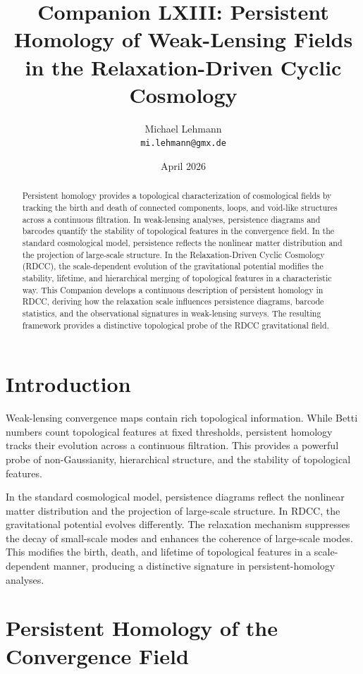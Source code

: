 \documentclass[11pt,a4paper]{article}
\title{\textbf{Companion LXIII: Persistent Homology of Weak-Lensing Fields in the Relaxation-Driven Cyclic Cosmology}}
\author{Michael Lehmann \\ \texttt{mi.lehmann@gmx.de}}
\date{April 2026}
\begin{document}
\maketitle

\begin{abstract}
Persistent homology provides a topological characterization of cosmological fields 
by tracking the birth and death of connected components, loops, and void-like 
structures across a continuous filtration. In weak-lensing analyses, persistence 
diagrams and barcodes quantify the stability of topological features in the 
convergence field. In the standard cosmological model, persistence reflects the 
nonlinear matter distribution and the projection of large-scale structure. In the 
Relaxation-Driven Cyclic Cosmology (RDCC), the scale-dependent evolution of the 
gravitational potential modifies the stability, lifetime, and hierarchical merging 
of topological features in a characteristic way. This Companion develops a 
continuous description of persistent homology in RDCC, deriving how the relaxation 
scale influences persistence diagrams, barcode statistics, and the observational 
signatures in weak-lensing surveys. The resulting framework provides a distinctive 
topological probe of the RDCC gravitational field.
\end{abstract}
\section{Introduction}

Weak-lensing convergence maps contain rich topological information. While Betti 
numbers count topological features at fixed thresholds, persistent homology tracks 
their evolution across a continuous filtration. This provides a powerful probe of 
non-Gaussianity, hierarchical structure, and the stability of topological features.

In the standard cosmological model, persistence diagrams reflect the nonlinear 
matter distribution and the projection of large-scale structure. In RDCC, the 
gravitational potential evolves differently. The relaxation mechanism suppresses 
the decay of small-scale modes and enhances the coherence of large-scale modes. 
This modifies the birth, death, and lifetime of topological features in a 
scale-dependent manner, producing a distinctive signature in persistent-homology 
analyses.
\section{Persistent Homology of the Convergence Field}
\end{document}
